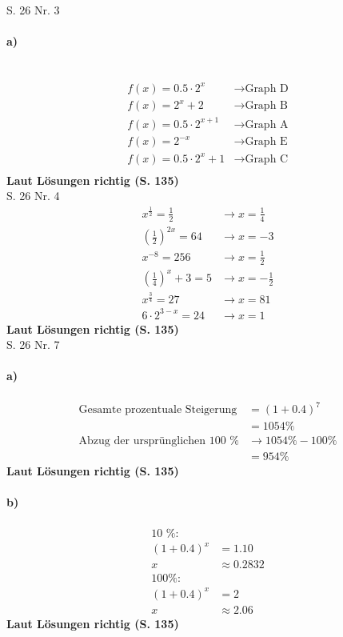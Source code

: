 \documentclass[12pt,a4paper]{report}
\newcommand{\richtig}[1]{\color{ForestGreen}\textbf{
	Laut Lösungen richtig (S. #1)
}\color{black}}
\begin{document}
	\noindent
	\Large S. 26 Nr. 3
	\large
	\noindent
	\paragraph{a)} \mbox{} \\
	\begin{align*}
		f(x) = 0.5 \cdot 2^x &\to \text{Graph D} \\
		f(x) = 2^x + 2 &\to \text{Graph B} \\
		f(x) = 0.5 \cdot 2^{x+1} &\to \text{Graph A} \\
		f(x) = 2^{-x} &\to \text{Graph E} \\
		f(x) = 0.5 \cdot 2^x + 1 &\to \text{Graph C} \\
	\end{align*}
	\richtig{135} \\[0.5cm]
	\Large S. 26 Nr. 4
	\large
	\noindent
	\begin{align*}
		x^{\frac{1}{2}} = \frac{1}{2} &\to x =\frac{1}{4} \\
		(\frac{1}{2})^{2x} = 64 &\to x= -3 \\
		x^{-8} = 256 &\to x = \frac{1}{2} \\
		(\frac{1}{4})^x + 3 = 5 &\to x = -\frac{1}{2} \\
		x^{\frac{3}{4}} = 27 &\to x = 81 \\
		6 \cdot 2^{3-x} = 24 &\to x = 1
 	\end{align*}
 	\richtig{135} \\[0.5cm]
 	\Large S. 26 Nr. 7
	\large
	\noindent
	\paragraph{a)}
	\begin{align*}
		\text{Gesamte prozentuale Steigerung} &= (1+0.4)^7 \\
		&= 1054 \% \\
		\text{Abzug der ursprünglichen 100 \%} &\to 1054 \% - 100 \% \\
		&= 954 \%
	\end{align*}
	\richtig{135}
	\paragraph{b)}
	\begin{align*}
		\text{10 \%:}& \\
		(1 + 0.4)^x &= 1.10 \\
		x&\approx 0.2832 \\
		\text{100\%:}& \\
		(1+0.4)^x &= 2 \\
		x &\approx 2.06
	\end{align*}
	\richtig{135}
\end{document}
